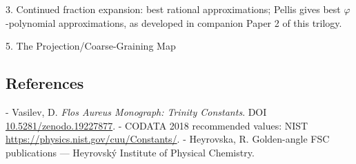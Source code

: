   3. Continued fraction expansion: best rational approximations; Pellis gives best
  $\varphi$-polynomial approximations, as developed in companion Paper 2 of this trilogy.

  5. The Projection/Coarse-Graining Map

\subsection{References}

- Vasilev, D. \textit{Flos Aureus Monograph: Trinity Constants}. DOI \href{https://zenodo.org/doi/10.5281/zenodo.19227877}{10.5281/zenodo.19227877}.
- CODATA 2018 recommended values: NIST \href{https://physics.nist.gov/cuu/Constants/}{https://physics.nist.gov/cuu/Constants/}.
- Heyrovska, R. Golden-angle FSC publications --- Heyrovský Institute of Physical Chemistry.
